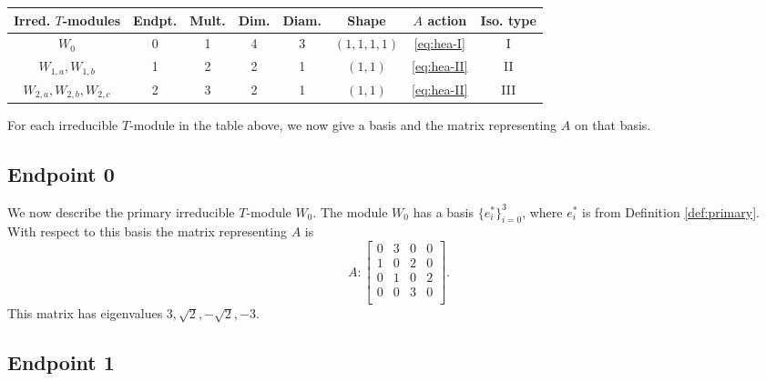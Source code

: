 \documentclass[12pt,letterpaper]{article}
\begin{document}
\begin{center}
\begin{tabular}{c | c c c c c c c}
\toprule
\textbf{Irred. $T$-modules} & \textbf{Endpt.} & \textbf{Mult.} & \textbf{Dim.} & \textbf{Diam.} & \textbf{Shape} & $A$ \textbf{action} & \textbf{Iso. type} \\
\midrule
$W_0$ & 0 & 1 & 4 & 3 & $(1,1,1,1)$ & \eqref{eq:hea-I} & I \\
$W_{1,a}, W_{1,b}$ & 1 & 2 & 2 & 1 & $(1,1)$ & \eqref{eq:hea-II} & II \\
$W_{2,a}, W_{2,b}, W_{2,c}$ & 2 & 3 & 2 & 1 & $(1,1)$ & \eqref{eq:hea-II} & III \\
\bottomrule
\end{tabular}

\smallskip
{}
\end{center}

For each irreducible $T$-module in the table above, we now give a basis and the matrix representing $A$ on that basis. 

\subsection{Endpoint 0}

We now describe the primary irreducible $T$-module $W_0$. The module $W_0$ has a basis $\{e_i^*\}_{i=0}^3$, where $e_i^*$ is from Definition \ref{def:primary}. With respect to this basis the matrix representing $A$ is
\begin{equation}
    A: \begin{bmatrix}
  0 & 3 & 0 & 0 \\
  1 & 0 & 2 & 0 \\
  0 & 1 & 0 & 2 \\
  0 & 0 & 3 & 0 \\
\end{bmatrix}.
\label{eq:hea-I}
\end{equation}
This matrix has eigenvalues $3, \sqrt{2}, -\sqrt{2}, -3$.

\subsection{Endpoint 1}
\end{document}
